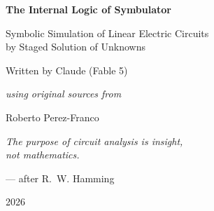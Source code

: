 \documentclass[11pt,oneside]{report}
\begin{document}

\begin{titlepage}
\centering
\vspace*{3cm}
{\Huge\bfseries The Internal Logic of Symbulator\par}
\vspace{0.6cm}
{\Large Symbolic Simulation of Linear Electric Circuits\\
by Staged Solution of Unknowns\par}
\vspace{2.5cm}
{\large Written by Claude (Fable 5)\par}
\vspace{0.25cm}
{\itshape using original sources from\par}
\vspace{0.25cm}
{\large Roberto Perez-Franco\par}
\vspace{3cm}
{\itshape The purpose of circuit analysis is insight,\\
not mathematics.\par}
\vspace{0.3cm}
{\small --- after R.~W. Hamming \cite{fragment2014}\par}
\vfill
{\large 2026\par}
\end{titlepage}
\end{document}
